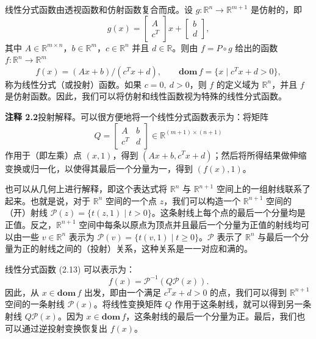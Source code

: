 \documentclass[UTF8, 12pt, fontset=fandol, oneside]{ctexart}
\begin{document}
线性分式函数由透视函数和仿射函数复合而成。设 $g:\mathbb{R}^n\to\mathbb{R}^{m+1}$ 是仿射的，即
\begin{equation}
  g(x)=
  \begin{bmatrix}
    A\\
    c^T
  \end{bmatrix}x+
  \begin{bmatrix}
    b\\
    d
  \end{bmatrix},
  \tag{2.12}
\end{equation}
其中 $A\in\mathbb{R}^{m\times n}$，$b\in\mathbb{R}^m$，$c\in\mathbb{R}^n$ 并且 $d\in\mathbb{R}$。则由 $f=P\circ g$ 给出的函数 $f:\mathbb{R}^n\to\mathbb{R}^m$
\begin{equation}
  f(x)=(Ax+b)/(c^Tx+d),\qquad
  \mathbf{dom}\,f=\{x\mid c^Tx+d>0\},
  \tag{2.13}
\end{equation}
称为线性分式（或投射）函数。如果 $c=0,\ d>0$，则 $f$ 的定义域为 $\mathbb{R}^n$，并且 $f$ 是仿射函数。因此，我们可以将仿射和线性函数视为特殊的线性分式函数。

\noindent\textbf{注释 2.2}\quad 投射解释。可以很方便地将一个线性分式函数表示为：将矩阵
\begin{equation}
  Q=
  \begin{bmatrix}
    A & b\\
    c^T & d
  \end{bmatrix}\in\mathbb{R}^{(m+1)\times(n+1)}
  \tag{2.14}
\end{equation}
作用于（即左乘）点 $(x,1)$，得到 $(Ax+b,c^Tx+d)$；然后将所得结果做伸缩变换或归一化，以使得其最后一个分量为一，得到 $(f(x),1)$。

也可以从几何上进行解释，即这个表达式将 $\mathbb{R}^n$ 与 $\mathbb{R}^{n+1}$ 空间上的一组射线联系了起来。也就是说，对于 $\mathbb{R}^n$ 空间的一个点 $z$，我们可以构造一个 $\mathbb{R}^{n+1}$ 空间的（开）射线 $\mathcal{P}(z)=\{t(z,1)\mid t>0\}$。这条射线上每个点的最后一个分量均是正值。反之，$\mathbb{R}^{n+1}$ 空间中每条以原点为顶点并且最后一个分量为正值的射线均可以由一些 $v\in\mathbb{R}^n$ 表示为 $\mathcal{P}(v)=\{t(v,1)\mid t\ge 0\}$。$\mathcal{P}$ 表示了 $\mathbb{R}^n$ 与最后一个分量为正的射线之间的（投射）关系，这种关系是一一对应和满的。

线性分式函数 (2.13) 可以表示为：
\[
  f(x)=\mathcal{P}^{-1}(Q\mathcal{P}(x)).
\]
因此，从 $x\in\mathbf{dom}\,f$ 出发，即由一个满足 $c^Tx+d>0$ 的点，我们可以得到 $\mathbb{R}^{n+1}$ 空间的一条射线 $\mathcal{P}(x)$。将线性变换矩阵 $Q$ 作用于这条射线，就可以得到另一条射线 $Q\mathcal{P}(x)$。因为 $x\in\mathbf{dom}\,f$，这条射线的最后一个分量为正。最后，我们也可以通过逆投射变换恢复出 $f(x)$。
\end{document}
